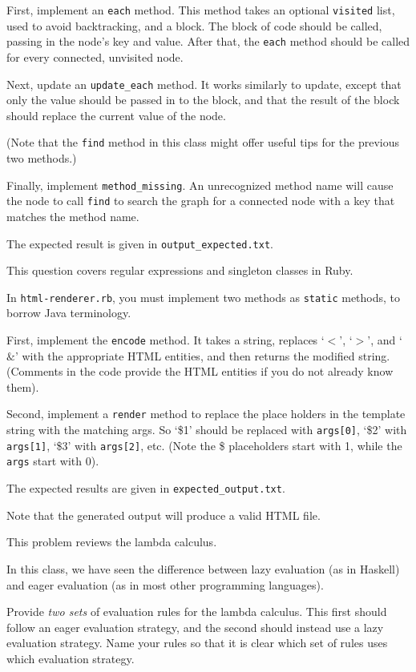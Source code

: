 \documentclass[addpoints]{exam}
\begin{document}
\begin{questions}
First, implement an {\tt each} method.
This method takes an optional {\tt visited} list, used to avoid backtracking, and a block.
The block of code should be called, passing in the node's key and value.
After that, the {\tt each} method should be called for every connected, unvisited node.

Next, update an {\tt update\_each} method.
It works similarly to update, except that only the value should be passed in to the block,
and that the result of the block should replace the current value of the node.

(Note that the {\tt find} method in this class might offer useful tips for the previous two methods.)

Finally, implement {\tt method\_missing}.
An unrecognized method name will cause the node to call {\tt find} to search the graph for a connected node
with a key that matches the method name.

The expected result is given in {\tt output\_expected.txt}.

\eject
\question[15]
This question covers regular expressions and singleton classes in Ruby.

In {\tt html-renderer.rb},  you must implement two methods as {\tt static} methods, to borrow Java terminology.

First, implement the {\tt encode} method.  It takes a string, replaces `$<$', `$>$', and `$\&$' with the
appropriate HTML entities, and then returns the modified string.  (Comments in the code provide the
HTML entities if you do not already know them).

Second, implement a {\tt render} method to replace the place holders in the template string with the matching args.
So `\$1' should be replaced with {\tt args[0]}, `\$2' with {\tt args[1]}, `\$3' with {\tt args[2]}, etc.
(Note the \$ placeholders start with 1, while the {\tt args} start with 0).

The expected results are given in {\tt expected\_output.txt}.

Note that the generated output will produce a valid HTML file.

\vskip 1in

\question[15]
This problem reviews the lambda calculus.

In this class, we have seen the difference between lazy evaluation (as in Haskell)
and eager evaluation (as in most other programming languages).

Provide {\em two sets} of evaluation rules for the lambda calculus.
This first should follow an eager evaluation strategy,
and the second should instead use a lazy evaluation strategy.
Name your rules so that it is clear which set of rules uses which evaluation strategy.


\end{questions}
\end{document}
